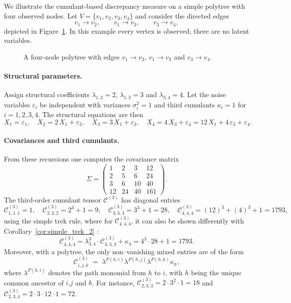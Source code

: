 \documentclass[11pt,a4paper]{article}
\numberwithin{equation}{section}
\begin{document}
We illustrate the cumulant‐based discrepancy measure on a simple polytree with four observed nodes.  Let $V=\{v_1,v_2,v_3,v_4\}$ and consider the directed edges
\[
  v_1 \longrightarrow v_2,\qquad
  v_1 \longrightarrow v_3,\qquad
  v_3 \longrightarrow v_4,
\]
depicted in Figure~\ref{fig:example-polytree}.  In this example every vertex is observed; there are no latent variables.

\begin{figure}[ht]
\centering
{}
\caption{A four‐node polytree with edges $v_1\to v_2$, $v_1\to v_3$ and $v_3\to v_4$.}
\label{fig:example-polytree}
\end{figure}

\paragraph{Structural parameters.}
Assign structural coefficients $\lambda_{1,2}=2$, $\lambda_{1,3}=3$ and $\lambda_{3,4}=4$.  Let the noise variables $\varepsilon_i$ be independent with variances $\sigma_i^2 = 1$ and third cumulants $\kappa_i = 1$ for $i=1,2,3,4$.  The structural equations are then
\[
  X_1 = \varepsilon_1,\quad
  X_2 = 2\,X_1 + \varepsilon_2,\quad
  X_3 = 3\,X_1 + \varepsilon_3,\quad
  X_4 = 4\,X_3 + \varepsilon_4 = 12\,X_1 + 4\,\varepsilon_3 + \varepsilon_4.
\]

\paragraph{Covariances and third cumulants.}
From these recursions one computes the covariance matrix
\[
\Sigma = 
\begin{pmatrix}
 1 &  2 &  3 & 12\\
 2 &  5 &  6 & 24\\
 3 &  6 & 10 & 40\\
12 & 24 & 40 & 161
\end{pmatrix}.
\]
The third‐order cumulant tensor $\mathcal{C}^{(3)}$ has diagonal entries
\[
 \mathcal{C}^{(3)}_{1,1,1} = 1,\quad
 \mathcal{C}^{(3)}_{2,2,2} = 2^3 + 1 = 9,\quad
 \mathcal{C}^{(3)}_{3,3,3} = 3^3 + 1 = 28,\quad
 \mathcal{C}^{(3)}_{4,4,4} = (12)^3 + (4)^3 + 1 = 1793,
\]
using the simple trek rule, where for $\mathcal{C}^{(3)}_{4,4,4}$, it can also be shown differently with Corollary~\ref{cor:simple_trek_2} :
\[
 \mathcal{C}^{(3)}_{4,4,4} = \lambda_{3,4}^3\cdot\mathcal{C}^{(3)}_{3,3,3} + \kappa_4 = 4^3\cdot28+1=1793.
\]
Moreover, with a polytree, the only non–vanishing mixed entries are of the form
\[
\mathcal{C}^{(3)}_{i,j,k} \;=\; \lambda^{P(h,i)}\lambda^{P(h,j)}\lambda^{P(h,k)}\kappa_h,
\]
where $\lambda^{P(h,i)}$ denotes the path monomial from $h$ to $i$, with $h$ being the unique common ancestor of $i$,$j$ and $k$. For instance, $\mathcal{C}^{(3)}_{2,3,3}=2\cdot 3^2\cdot1=18$ and $\mathcal{C}^{(3)}_{2,3,4}=2\cdot3\cdot12\cdot1=72$.
\end{document}
